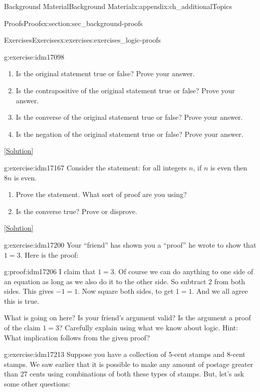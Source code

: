 \documentclass[oneside,10pt,]{book}
\numberwithin{equation}{chapter}
\begin{document}
\begin{appendixptx}{Background Material}{}{Background Material}{}{}{x:appendix:ch_additionalTopics}
\begin{sectionptx}{Proofs}{}{Proofs}{}{}{x:section:sec_background-proofs}
\begin{exercises-subsection}{Exercises}{}{Exercises}{}{}{x:exercises:exercises_logic-proofs}
\begin{divisionexercise}{1}{}{}{g:exercise:idm17098}
\begin{enumerate}[label=(\alph*)]
\item{}Is the original statement true or false? Prove your answer.%
\item{}Is the contrapositive of the original statement true or false? Prove your answer.%
\item{}Is the converse of the original statement true or false? Prove your answer.%
\item{}Is the negation of the original statement true or false? Prove your answer.%
\end{enumerate}
%
\space\hspace*{0pt}\hfill{\tiny\hyperlink{g:solution:idm17123-main}{[Solution]}}\end{divisionexercise}%
\begin{divisionexercise}{2}{}{}{g:exercise:idm17167}%
Consider the statement: for all integers \(n\), if \(n\) is even then \(8n\) is even.%
\par
%
\begin{enumerate}[label=(\alph*)]
\item{}Prove the statement. What sort of proof are you using?%
\item{}Is the converse true? Prove or disprove.%
\end{enumerate}
%
\space\hspace*{0pt}\hfill{\tiny\hyperlink{g:solution:idm17179-main}{[Solution]}}\end{divisionexercise}%
\begin{divisionexercise}{3}{}{}{g:exercise:idm17200}%
Your ``friend'' has shown you a ``proof'' he wrote to show that \(1 = 3\). Here is the proof:%
\begin{proofptx}{}{g:proof:idm17206}
I claim that \(1 = 3\). Of course we can do anything to one side of an equation as long as we also do it to the other side. So subtract 2 from both sides. This gives \(-1 = 1\). Now square both sides, to get \(1 = 1\). And we all agree this is true.%
\end{proofptx}
What is going on here? Is your friend's argument valid? Is the argument a proof of the claim \(1=3\)? Carefully explain using what we know about logic. Hint: What implication follows from the given proof?%
\end{divisionexercise}%
\begin{divisionexercise}{4}{}{}{g:exercise:idm17213}%
Suppose you have a collection of 5-cent stamps and 8-cent stamps. We saw earlier that it is possible to make any amount of postage greater than 27 cents using combinations of both these types of stamps. But, let's ask some other questions:%

\end{divisionexercise}
\end{exercises-subsection}
\end{sectionptx}
\end{appendixptx}
\end{document}

